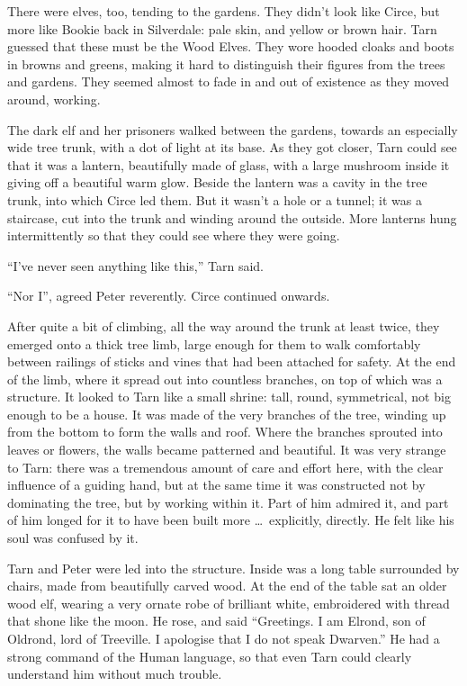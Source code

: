 There were elves, too, tending to the gardens.  They didn't look like Circe, but more like Bookie back in Silverdale: pale skin, and yellow or brown hair.  Tarn guessed that these must be the Wood Elves.  They wore hooded cloaks and boots in browns and greens, making it hard to distinguish their figures from the trees and gardens.  They seemed almost to fade in and out of existence as they moved around, working.

The dark elf and her prisoners walked between the gardens, towards an especially wide tree trunk, with a dot of light at its base.  As they got closer, Tarn could see that it was a lantern, beautifully made of glass, with a large mushroom inside it giving off a beautiful warm glow.  Beside the lantern was a cavity in the tree trunk, into which Circe led them.  But it wasn't a hole or a tunnel; it was a staircase, cut into the trunk and winding around the outside.  More lanterns hung intermittently so that they could see where they were going.

``I've never seen anything like this,'' Tarn said.

``Nor I'', agreed Peter reverently.  Circe continued onwards.

After quite a bit of climbing, all the way around the trunk at least twice, they emerged onto a thick tree limb, large enough for them to walk comfortably between railings of sticks and vines that had been attached for safety.  At the end of the limb, where it spread out into countless branches, on top of which was a structure.  It looked to Tarn like a small shrine: tall, round, symmetrical, not big enough to be a house.  It was made of the very branches of the tree, winding up from the bottom to form the walls and roof.  Where the branches sprouted into leaves or flowers, the walls became patterned and beautiful.  It was very strange to Tarn: there was a tremendous amount of care and effort here, with the clear influence of a guiding hand, but at the same time it was constructed not by dominating the tree, but by working within it.  Part of him admired it, and part of him longed for it to have been built more \ldots\ explicitly, directly.  He felt like his soul was confused by it.

Tarn and Peter were led into the structure.  Inside was a long table surrounded by chairs, made from beautifully carved wood.  At the end of the table sat an older wood elf, wearing a very ornate robe of brilliant white, embroidered with thread that shone like the moon.  He rose, and said ``Greetings.  I am Elrond, son of Oldrond, lord of Treeville.  I apologise that I do not speak Dwarven.''  He had a strong command of the Human language, so that even Tarn could clearly understand him without much trouble.

